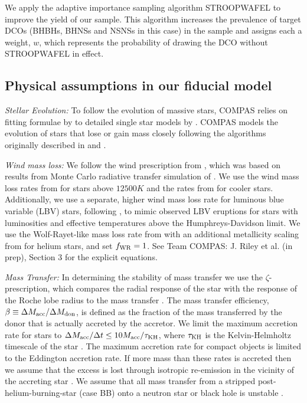 We apply the adaptive importance sampling algorithm STROOPWAFEL \citep{Broekgaarden+2019} to improve the yield of our sample. This algorithm increases the prevalence of target DCOs (BHBHs, BHNSs and NSNSs in this case) in the sample and assigns each a weight, $w$, which represents the probability of drawing the DCO without STROOPWAFEL in effect.

\subsection{Physical assumptions in our fiducial model}\label{app:fiducial_physics}

\textit{Stellar Evolution:} To follow the evolution of massive stars, COMPAS relies on fitting formulae by \citet{Hurley+2000} to detailed single star models by \citet{Pols+1998}. COMPAS models the evolution of stars that lose or gain mass closely following the algorithms originally described in \citet{Tout+1996} and \citet{Hurley+2002}.

\textit{Wind mass loss:} We follow the wind prescription from \citet{Belczynski+2008}, which was based on results from Monte Carlo radiative transfer simulation of \citet{Vink+2000, Vink+2001}. We use the wind mass loss rates from \citet{Vink+2001} for stars above $12500 \unit{K}$ and the rates from \citet{Hurley+2000} for cooler stars. Additionally, we use a separate, higher wind mass loss rate for luminous blue variable (LBV) stars, following \citet{Belczynski+2008}, to mimic observed LBV eruptions for stars with luminosities and effective temperatures above the Humphreys-Davidson limit. We use the Wolf-Rayet-like mass loss rate from \citet{Hamann+1998} with an additional metallicity scaling from \citet{Vink+2005} for helium stars, and set $f_{\rm WR} = 1$. See Team COMPAS: J. Riley et al. (in prep), Section 3 for the explicit equations.

\textit{Mass Transfer:} In determining the stability of mass transfer we use the $\zeta$-prescription, which compares the radial response of the star with the response of the Roche lobe radius to the mass transfer \citep[e.g.][]{Hjellming+1987}. The mass transfer efficiency, $\beta \equiv \Delta M_{\rm acc} / \Delta M_{\rm don}$, is defined as the fraction of the mass transferred by the donor that is actually accreted by the accretor. We limit the maximum accretion rate for stars to $\Delta M_{\rm acc} / \Delta t \le 10 M_{\rm acc} / \tau_{\rm KH}$, where $\tau_{\rm KH}$ is the Kelvin-Helmholtz timescale of the star \citep{Paczynski+1972, Hurley+2002}. The maximum accretion rate for compact objects is limited to the Eddington accretion rate. If more mass than these rates is accreted then we assume that the excess is lost through isotropic re-emission in the vicinity of the accreting star \citep[e.g.][]{Massevitch+1975, Soberman+1997}. We assume that all mass transfer from a stripped post-helium-burning-star (case BB) onto a neutron star or black hole is unstable \citep{Tauris+2015}.

